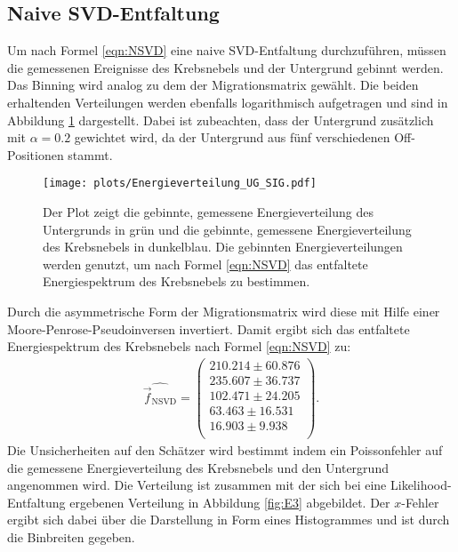 \subsection{Naive SVD-Entfaltung}
Um nach Formel \eqref{eqn:NSVD} eine naive SVD-Entfaltung durchzuführen, müssen die gemessenen Ereignisse des Krebsnebels und der Untergrund gebinnt werden. Das Binning wird analog zu dem der Migrationsmatrix gewählt. Die beiden erhaltenden Verteilungen werden ebenfalls logarithmisch aufgetragen und sind in Abbildung \ref{fig:UG_Sig} dargestellt. Dabei ist zubeachten, dass der Untergrund zusätzlich mit $\alpha=0.2$ gewichtet wird, da der Untergrund aus fünf verschiedenen Off-Positionen stammt.\\
\begin{figure}
  \centering
  \texttt{[image: plots/Energieverteilung\_UG\_SIG.pdf]}
  \caption{Der Plot zeigt die gebinnte, gemessene Energieverteilung des Untergrunds in grün und die gebinnte, gemessene Energieverteilung des Krebsnebels in dunkelblau. Die gebinnten Energieverteilungen werden genutzt, um nach Formel \eqref{eqn:NSVD} das entfaltete Energiespektrum des Krebsnebels zu bestimmen.}
  \label{fig:UG_Sig}
\end{figure}
Durch die asymmetrische Form der Migrationsmatrix wird diese mit Hilfe einer Moore-Penrose-Pseudoinversen invertiert. Damit ergibt sich das entfaltete Energiespektrum des Krebsnebels nach Formel \eqref{eqn:NSVD} zu:
\begin{align*}
	\hat{\vec{f}_{\text{NSVD}}} = \begin{pmatrix}
			210.214 \pm 60.876\\
			235.607 \pm 36.737\\
			102.471 \pm 24.205\\
			63.463 \pm 16.531\\
			16.903 \pm 9.938\\
	\end{pmatrix}.
\end{align*}
Die Unsicherheiten auf den Schätzer wird bestimmt indem ein Poissonfehler auf die gemessene Energieverteilung des Krebsnebels und den Untergrund angenommen wird. Die Verteilung ist zusammen mit der sich bei eine Likelihood-Entfaltung ergebenen Verteilung in Abbildung \ref{fig:E3} abgebildet. Der $x$-Fehler ergibt sich dabei über die Darstellung in Form eines Histogrammes und ist durch die Binbreiten gegeben.
